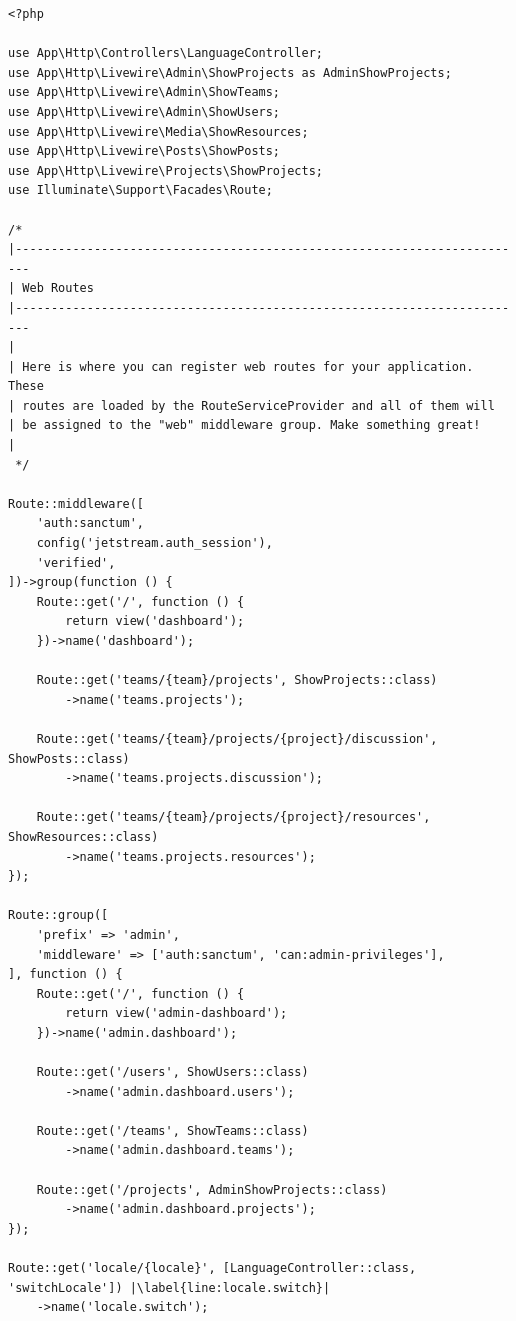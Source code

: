 \begin{lstlisting}[caption={Sadržaj datoteke \texttt{routes/web.php}}, label=routes, escapechar=|]
<?php

use App\Http\Controllers\LanguageController;
use App\Http\Livewire\Admin\ShowProjects as AdminShowProjects;
use App\Http\Livewire\Admin\ShowTeams;
use App\Http\Livewire\Admin\ShowUsers;
use App\Http\Livewire\Media\ShowResources;
use App\Http\Livewire\Posts\ShowPosts;
use App\Http\Livewire\Projects\ShowProjects;
use Illuminate\Support\Facades\Route;

/*
|------------------------------------------------------------------------
| Web Routes
|------------------------------------------------------------------------
|
| Here is where you can register web routes for your application. These
| routes are loaded by the RouteServiceProvider and all of them will
| be assigned to the "web" middleware group. Make something great!
|
 */

Route::middleware([
    'auth:sanctum',
    config('jetstream.auth_session'),
    'verified',
])->group(function () {
    Route::get('/', function () {
        return view('dashboard');
    })->name('dashboard');

    Route::get('teams/{team}/projects', ShowProjects::class)
        ->name('teams.projects');

    Route::get('teams/{team}/projects/{project}/discussion', ShowPosts::class)
        ->name('teams.projects.discussion');

    Route::get('teams/{team}/projects/{project}/resources', ShowResources::class)
        ->name('teams.projects.resources');
});

Route::group([
    'prefix' => 'admin',
    'middleware' => ['auth:sanctum', 'can:admin-privileges'],
], function () {
    Route::get('/', function () {
        return view('admin-dashboard');
    })->name('admin.dashboard');

    Route::get('/users', ShowUsers::class)
        ->name('admin.dashboard.users');

    Route::get('/teams', ShowTeams::class)
        ->name('admin.dashboard.teams');

    Route::get('/projects', AdminShowProjects::class)
        ->name('admin.dashboard.projects');
});

Route::get('locale/{locale}', [LanguageController::class, 'switchLocale']) |\label{line:locale.switch}|
    ->name('locale.switch');

\end{lstlisting}


